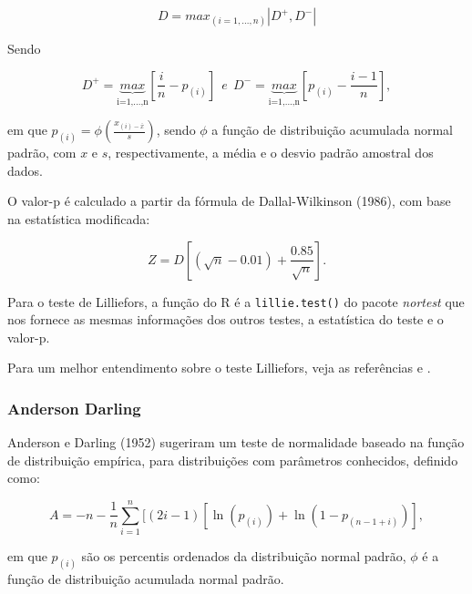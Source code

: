 \documentclass[a4paper,11pt]{article} %
\begin{document}
\begin{equation}
   D = max_{(i=1,...,n)}|D^{+},D^{-}|
\end{equation}

Sendo

\begin{equation}
    D^{+} =   \underbrace{max}_{\mbox{i=1,...,n}}    {\left[\frac{i}{n} - p_{(i)}\right]} \ \ e \ \ D^{-} = \underbrace{max}_{\mbox{i=1,...,n}}  {\left[p_{(i)} - \frac{i-1}{n}\right]},
\end{equation}

\noindent em que $p_{(i)}= \phi( \frac{x_{(i)-\bar{x}}}{s} )$, sendo $\phi$ a função de distribuição acumulada normal padrão, com $x$ e $s$, respectivamente, a média e o desvio padrão amostral dos dados.

\vspace{0.5cm}

O valor-p é calculado a partir da fórmula de Dallal-Wilkinson (1986), com base na estatística modificada:

\begin{equation}
    Z = D \left[(\sqrt{n} - 0.01) + \frac{0.85}{\sqrt{n}} \right].
\end{equation}

\vspace{0.5cm}

Para o teste de Lilliefors, a função do R é a \texttt{lillie.test()} do pacote \textit{nortest} que nos fornece as mesmas informações dos outros testes, a estatística do teste e o valor-p. 

\vspace{0.5cm}

Para um melhor entendimento sobre o teste Lilliefors, veja as referências  \cite{lilliefors1967kolmogorov} e \cite{dallal1986analytic}.

\subsubsection{Anderson Darling}

Anderson e Darling (1952) sugeriram um teste de normalidade baseado na função de distribuição empírica, para distribuições com parâmetros conhecidos, definido como: 

\begin{equation}
    A = -n - \frac{1}{n} \sum_{i=1}^{n} [(2i-1)[ \ln (p_{(i)}) + \ln(1- p_{(n-1+i)})],
\end{equation}

\noindent em que $p_{(i)}$ são os percentis ordenados da distribuição normal padrão, $\phi$ é a função de distribuição acumulada normal padrão.
\end{document}
